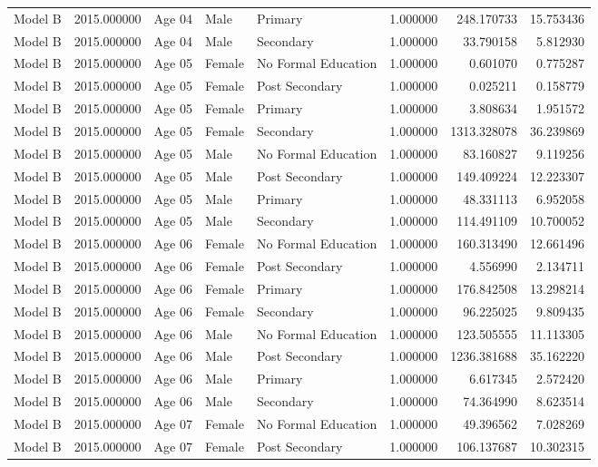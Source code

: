 \begin{table}[ht]
\begin{tabular}{lrlllrrr}
Model B & 2015.000000 & Age 04 & Male & Primary & 1.000000 & 248.170733 & 15.753436 \\
Model B & 2015.000000 & Age 04 & Male & Secondary & 1.000000 & 33.790158 & 5.812930 \\
Model B & 2015.000000 & Age 05 & Female & No Formal Education & 1.000000 & 0.601070 & 0.775287 \\
Model B & 2015.000000 & Age 05 & Female & Post Secondary & 1.000000 & 0.025211 & 0.158779 \\
Model B & 2015.000000 & Age 05 & Female & Primary & 1.000000 & 3.808634 & 1.951572 \\
Model B & 2015.000000 & Age 05 & Female & Secondary & 1.000000 & 1313.328078 & 36.239869 \\
Model B & 2015.000000 & Age 05 & Male & No Formal Education & 1.000000 & 83.160827 & 9.119256 \\
Model B & 2015.000000 & Age 05 & Male & Post Secondary & 1.000000 & 149.409224 & 12.223307 \\
Model B & 2015.000000 & Age 05 & Male & Primary & 1.000000 & 48.331113 & 6.952058 \\
Model B & 2015.000000 & Age 05 & Male & Secondary & 1.000000 & 114.491109 & 10.700052 \\
Model B & 2015.000000 & Age 06 & Female & No Formal Education & 1.000000 & 160.313490 & 12.661496 \\
Model B & 2015.000000 & Age 06 & Female & Post Secondary & 1.000000 & 4.556990 & 2.134711 \\
Model B & 2015.000000 & Age 06 & Female & Primary & 1.000000 & 176.842508 & 13.298214 \\
Model B & 2015.000000 & Age 06 & Female & Secondary & 1.000000 & 96.225025 & 9.809435 \\
Model B & 2015.000000 & Age 06 & Male & No Formal Education & 1.000000 & 123.505555 & 11.113305 \\
Model B & 2015.000000 & Age 06 & Male & Post Secondary & 1.000000 & 1236.381688 & 35.162220 \\
Model B & 2015.000000 & Age 06 & Male & Primary & 1.000000 & 6.617345 & 2.572420 \\
Model B & 2015.000000 & Age 06 & Male & Secondary & 1.000000 & 74.364990 & 8.623514 \\
Model B & 2015.000000 & Age 07 & Female & No Formal Education & 1.000000 & 49.396562 & 7.028269 \\
Model B & 2015.000000 & Age 07 & Female & Post Secondary & 1.000000 & 106.137687 & 10.302315 \\

\end{tabular}
\end{table}
